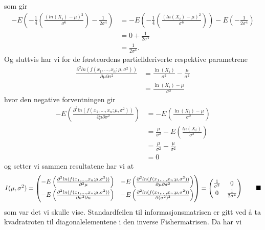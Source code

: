 \documentclass[12pt,
               a4paper,
               article,
               oneside,
               oldfontcommands,
               norsk]{memoir}
\newcommand{\Q}{ \qquad \hfill \blacksquare}
\begin{document}
som gir 
\begin{align*}
    -E\left(-\frac{1}{4} \left( \frac{(ln(X_i) - \mu)^2}{\sigma^6} \right) - \frac{1}{2\sigma^4} \right) &=  -E\left(-\frac{1}{4} \left( \frac{(ln(X_i) - \mu)^2}{\sigma^6} \right) \right) - E\left( - \frac{1}{2\sigma^4} \right) \\[7pt]
    &= 0 + \frac{1}{2 \sigma^4} \\[7pt]
    & = \frac{1}{2 \sigma^4}.
\end{align*}
Og sluttvis har vi for de førsteordens partiellderiverte respektive parametrene
\begin{align*}
    \frac{\partial^2 ln(f(x_1, \ldots, x_n; \mu, \sigma^2))}{\partial \mu \partial \sigma^2} &= \frac{\ln(X_i)}{\sigma^2} - \frac{\mu}{\sigma^2} \\[7pt]
    &= \frac{\ln(X_i) - \mu}{\sigma^2}
\end{align*}
hvor den negative forventningen gir 
\begin{align*}
    -E \left(\frac{\partial^2 ln(f(x_1, \ldots, x_n; \mu, \sigma^2))}{\partial \mu \partial \sigma^2} \right) &= -E \left( \frac{\ln(X_i) - \mu}{\sigma^2} \right) \\[7pt]
    &= \frac{\mu}{\sigma^2} - E \left( \frac{ln(X_i)}{\sigma^2}\right) \\[7pt]
    &= \frac{\mu}{\sigma^2} - \frac{\mu}{\sigma^2} \\[7pt]
    &= 0
\end{align*}
og setter vi sammen resultatene har vi at 
\begin{align*}
    I(\mu, \sigma^2) = 
    \begin{pmatrix}
        -E \left(\frac{\partial^2 ln(f(x_1, \ldots, x_n; \mu, \sigma^2))}{\partial^2 \mu} \right) & -E \left( \frac{\partial^2 ln(f(x_1, \ldots, x_n; \mu, \sigma^2))}{\partial \mu \partial \sigma^2} \right) \\[5pt]
       -E \left(\frac{\partial^2 ln(f(x_1, \ldots, x_n; \mu, \sigma^2))}{\partial \sigma^2 \partial u} \right) & -E \left( \frac{\partial^2 ln(f(x_1, \ldots, x_n; \mu, \sigma^2))}{\partial (\sigma^2)^2} \right)
    \end{pmatrix}
    = 
    \begin{pmatrix}
        \frac{1}{\sigma^2} & 0\\[3pt]
        0 & \frac{1}{2 \sigma^4}
    \end{pmatrix} \Q
\end{align*}
som var det vi skulle vise. Standardfeilen til informasjonsmatrisen er gitt ved å ta kvadratroten til diagonalelementene i den inverse Fishermatrisen. Da har vi 
\end{document}
